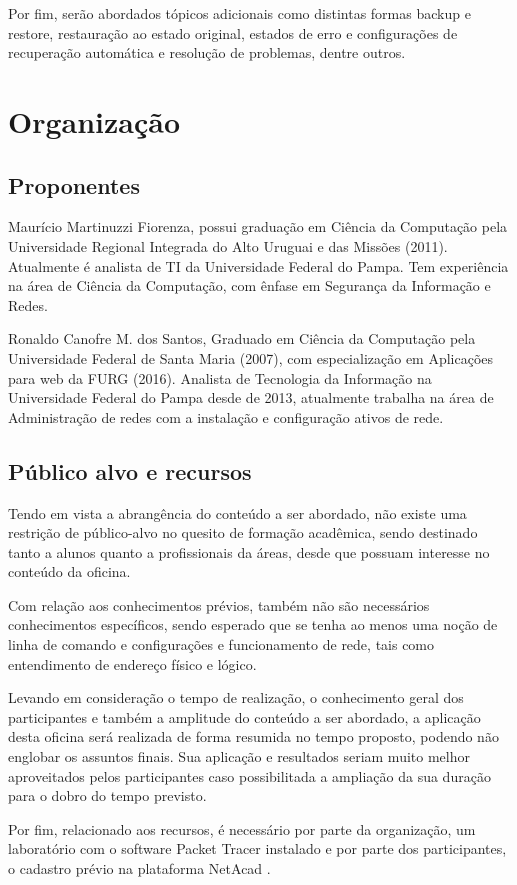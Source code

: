 \documentclass[12pt]{article}
\begin{document}
Por fim, serão abordados tópicos adicionais como distintas formas backup e restore, restauração ao estado original, estados de erro e configurações de recuperação automática e resolução de problemas, dentre outros. 

\section{Organização}

\subsection{Proponentes}
Maurício Martinuzzi Fiorenza, possui graduação em Ciência da Computação pela Universidade Regional Integrada do Alto Uruguai e das Missões (2011). Atualmente é analista de TI da Universidade Federal do Pampa. Tem experiência na área de Ciência da Computação, com ênfase em Segurança da Informação e Redes.

Ronaldo Canofre M. dos Santos, Graduado em Ciência da Computação pela Universidade Federal de Santa Maria (2007), com especialização em Aplicações para web da FURG (2016). Analista de Tecnologia da Informação na Universidade Federal do Pampa desde de 2013, atualmente trabalha na área de Administração de redes com a instalação e configuração ativos de rede.

\subsection{Público alvo e recursos}
Tendo em vista a abrangência do conteúdo a ser abordado, não existe uma restrição de público-alvo no quesito de formação acadêmica, sendo destinado tanto a alunos quanto a profissionais da áreas, desde que possuam interesse no conteúdo da oficina.

Com relação aos conhecimentos prévios, também não são necessários conhecimentos específicos, sendo esperado que se tenha ao menos uma noção de linha de comando e configurações e funcionamento de rede, tais como entendimento de endereço físico e lógico.

Levando em consideração o tempo de realização, o conhecimento geral dos participantes e também a amplitude do conteúdo a ser abordado, a aplicação desta oficina será realizada de forma resumida no tempo proposto, podendo não englobar os assuntos finais. Sua aplicação e resultados seriam muito melhor aproveitados pelos participantes caso possibilitada a ampliação da sua duração para o dobro do tempo previsto. 

Por fim, relacionado aos recursos, é necessário por parte da organização, um laboratório com o software Packet Tracer instalado e por parte dos participantes, o cadastro prévio na plataforma NetAcad \cite{netacad:19}.



\end{document}
